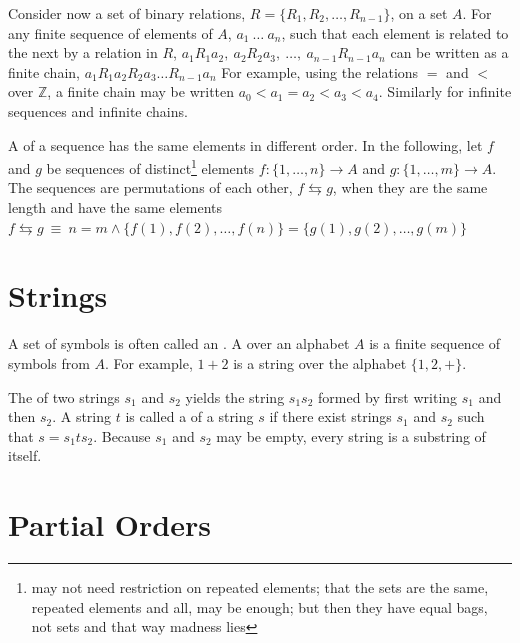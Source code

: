 \pn Consider now a set of binary relations, $R=\{R_1,R_2,\ldots,R_{n\minus 1}\}$, on a set $A$.  For any finite sequence of elements of $A$, 
$a_1~\ldots~a_n$, such that each element is related to the next by a relation in $R$,
\(a_1 R_1 a_2,~a_2 R_2 a_3,~\ldots,~a_{n\minus 1} R_{n\minus 1} a_n\)
can be written as a finite chain,
\(a_1 R_1 a_2 R_2 a_3 \ldots R_{n\minus 1} a_n\)
For example, using the relations $=$ and $<$ over $\mathbb{Z}$, a finite chain may be written
\(a_0<a_1=a_2<a_3<a_4\).  
Similarly for infinite sequences and infinite chains.

\pn A  of a sequence has the same elements in different order.  In the following, let $f$ and $g$ be sequences of distinct\footnote{may not need restriction on repeated elements; that the sets are the same, repeated elements and all, may be enough; but then they have equal bags, not sets and that way madness lies} elements
\(f:\{1,\ldots,n\} \rightarrow A\) and \(g:\{1,\ldots,m\} \rightarrow A\).  
The sequences are permutations of each other, $f \leftrightarrows g$, when they are the same length and have the same elements
\(f\leftrightarrows g~\equiv~n=m\land \{f(1),f(2),\ldots,f(n)\}=\{g(1),g(2),\ldots,g(m)\}\)


\section{Strings}\label{sec:informal_strings}

\pn A set of symbols is often called an .  A  over an alphabet $A$
is a finite sequence of symbols from $A$.  For example, $1+2$ is a string over the alphabet
$\{1,2,+\}$.  %

\pn The  of two strings $s_1$ and $s_2$ yields the string $s_{1}s_{2}$ 
formed by first writing $s_1$ and then $s_2$.  
A string $t$ is called a  of a string $s$ if there exist strings $s_1$ and $s_2$
such that $s=s_{1}t s_{2}$.  Because $s_1$ and $s_2$ may be empty, every string is a substring of itself.

\section{Partial Orders}\label{sec:informal_partialorders}

